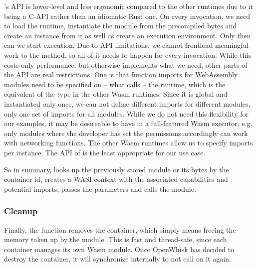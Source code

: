 \begin{description}[style=multiline, leftmargin=2.5cm, font=\bfseries]
    \item[Wamr] 's API is lower-level and less ergonomic compared to the other runtimes due to it being a C-API rather than an idiomatic Rust one. On every  invocation, we need to load the runtime, instantiate the module from the precompiled bytes and create an instance from it as well as create an execution environment. Only then can we start execution. Due to API limitations, we cannot frontload meaningful work to the  method, so all of it needs to happen for every invocation.
    While this costs only performance, but otherwise implements what we need, other parts of the API are real restrictions. One is that function imports for WebAssembly modules need to be specified on -- what  calls -- the runtime, which is the equivalent of the  type in the other Wasm runtimes. Since it is global and instantiated only once, we can not define different imports for different modules, only one set of imports for all modules. While we do not need this flexibility for our examples, it may be desireable to have in a full-featured Wasm executor, e.g. only modules where the developer has set the permissions accordingly can work with networking functions. The other Wasm runtimes allow us to specify imports per instance. The API of  is the least appropriate for our use case.

\end{description}

So in summary,  looks up the previously stored module or its bytes by the container id, creates a WASI context with the associated capabilities and potential imports, passes the parameters and calls the module.


\subsubsection{Cleanup}
Finally, the  function removes the container, which simply means freeing the memory taken up by the module. This is fast and thread-safe, since each container manages its own Wasm module. Once OpenWhisk has decided to destroy the container, it will synchronize internally to not call  on it again.

